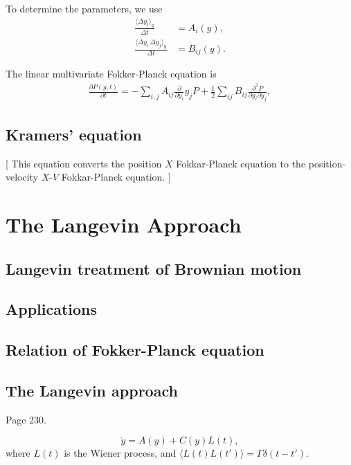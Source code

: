 \documentclass{book}
\numberwithin{equation}{section}
\theoremstyle{plain}
\theoremstyle{definition}
\theoremstyle{remark}
\begin{document}
To determine the parameters, we use
\begin{equation}
\begin{aligned}
\frac{ \langle \Delta y_i \rangle_y } { \Delta t }
&=
A_i(y), \\
\frac{ \langle \Delta y_i \, \Delta y_j \rangle_y } { \Delta t }
&=
B_{ij}(y).
\end{aligned}
\tag{6.3}
\end{equation}

The linear multivariate Fokker-Planck equation is
\begin{align}
\frac{  \partial P(y, t) } { \partial t }
=
-\sum_{i,j} A_{ij} \frac{ \partial } { \partial y_i } y_j P
+ \frac 1 2 \sum_{ij} B_{ij} \frac{ \partial^2 P } { \partial y_i \partial y_j },
\tag{6.4}
\end{align}

\section{Kramers' equation}

[
  This equation converts the position $X$ Fokkar-Planck equation
  to the position-velocity $X$-$V$ Fokkar-Planck equation.
]

\chapter{The Langevin Approach}

\section{Langevin treatment of Brownian motion}

\section{Applications}

\section{Relation of Fokker-Planck equation}

\section{The Langevin approach}

Page 230.

$$
\dot y = A(y) + C(y) L(t),
$$
where $L(t)$ is the Wiener process,
and $\langle L(t) L(t') \rangle = \Gamma \delta(t - t')$.
\end{document}
